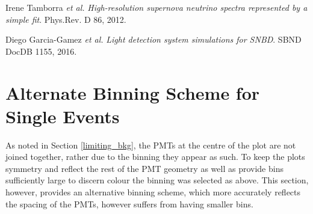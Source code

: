 \documentclass[a4paper]{article}
\begin{document}
\begin{thebibliography}{1}

 Irene Tamborra {\em et al.} {\em High-resolution supernova neutrino spectra represented by a simple fit}. Phys.Rev. D 86, 2012.

 Diego Garcia-Gamez {\em et al.} {\em Light detection system simulations for SNBD}. SBND DocDB 1155, 2016.

\end{thebibliography}


\pagebreak
\appendix
\section{Alternate Binning Scheme for Single Events}\label{alt_binning}

As noted in Section \ref{limiting_bkg}, the PMTs at the centre of the plot are not joined together, rather due to the binning they appear as such. To keep the plots symmetry and reflect the rest of the PMT geometry as well as provide bins sufficiently large to discern colour the binning was selected as above. This section, however, provides an alternative binning scheme, which more accurately reflects the spacing of the PMTs, however suffers from having smaller bins.
\end{document}
